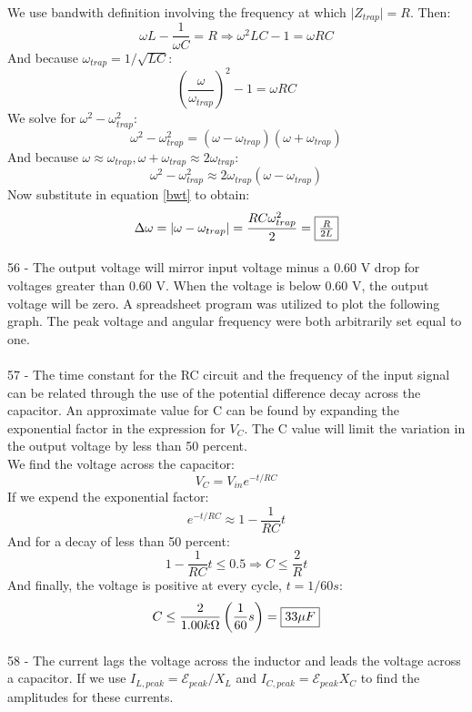 \documentclass{report}
\begin{document}
We use bandwith definition involving the frequency at which $\lvert Z_{trap} \rvert = R$. Then:
$$\omega L - \frac{1}{\omega C} = R \Rightarrow \omega^2 LC - 1 = \omega RC$$
And because $\omega_{trap} = 1 / \sqrt{LC}$:
$$\left( \frac{\omega}{\omega_{trap}} \right)^2 - 1 = \omega RC$$
We solve for $\omega^2 - \omega_{trap}^2$:
$$\omega^2 - \omega_{trap}^2 = (\omega - \omega_{trap})(\omega + \omega_{trap})$$
And because $\omega \approx \omega_{trap}, \omega + \omega_{trap} \approx 2\omega_{trap}$:
$$\omega^2 - \omega_{trap}^2 \approx 2\omega_{trap}(\omega - \omega_{trap})$$
Now substitute in equation \ref{bwt} to obtain:
$$\Delta \omega = \lvert \omega - \omega_{trap} \rvert = \frac{RC\omega_{trap}^2}{2} = \fbox{$\frac{R}{2L}$}$$

\paragraph{}
56 - The output voltage will mirror input voltage minus a 0.60 V drop for voltages greater than 0.60 V. When the voltage is below 0.60 V, the output voltage will be zero. A spreadsheet program was utilized to plot the following graph. The peak voltage and angular frequency were both arbitrarily set equal to one.\\

\paragraph{}
57 - The time constant for the RC circuit and the frequency of the input signal can be related through the use of the potential difference decay across the capacitor. An approximate value for C can be found by expanding the exponential factor in the expression for $V_C$. The C value will limit the variation in the output voltage by less than 50 percent.\\
We find the voltage across the capacitor:
$$V_C = V_{in} e^{-t / RC}$$
If we expend the exponential factor:
$$e^{-t / RC} \approx 1 - \frac{1}{RC}t$$
And for a decay of less than 50 percent:
$$1 - \frac{1}{RC}t \le 0.5 \Rightarrow C \le \frac{2}{R}t$$
And finally, the voltage is positive at every cycle, $t = 1 / 60 s$:
$$C \le \frac{2}{1.00k\Omega}\left( \frac{1}{60}s \right) = \fbox{$33\mu F$}$$

\paragraph{}
58 - The current lags the voltage across the inductor and leads the voltage across a capacitor. If we use $I_{L, peak} = \mathcal{E}_{peak} / X_L$ and $I_{C, peak} = \mathcal{E}_{peak}X_C$ to find the amplitudes for these currents.
\end{document}
